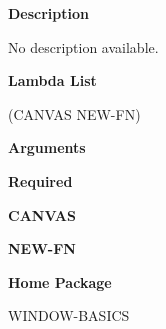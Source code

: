  
{\bf Description}

No description available.

 
{\bf Lambda List}

(CANVAS NEW-FN)

 
{\bf Arguments}


\beginhang
{\bf Required}\hspace{2em}
 
{\bf CANVAS}


 
{\bf NEW-FN}


 
\endhang
 
{\bf Home Package}

WINDOW-BASICS

